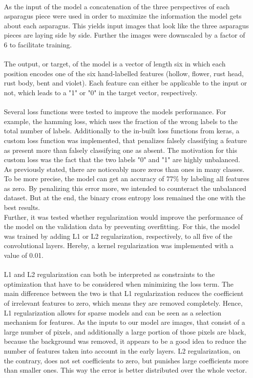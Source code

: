 \\
As the input of the model a concatenation of the three perspectives of each asparagus piece were used in order to maximize the information the model gets about each asparagus. This yields input images that look like the three asparagus pieces are laying side by side. Further the images were downscaled by a factor of 6 to facilitate training. \\
\\
The output, or target, of the model is a vector of length six in which each position encodes one of the six hand-labelled features (hollow, flower, rust head, rust body, bent and violet). Each feature can either be applicable to the input or not, which leads to a "1" or "0" in the target vector, respectively. \\
\\
Several loss functions were tested to improve the models performance. For example, the hamming loss, which uses the fraction of the wrong labels to the total number of labels. Additionally to the in-built loss functions from keras, a custom loss function was implemented, that penalizes falsely classifying a feature as present more than falsely classifying one as absent. The motivation for this custom loss was the fact that the two labels "0" and "1" are highly unbalanced. As previously stated, there are noticeably more zeros than ones in many classes. To be more precise, the model can get an accuracy of 77\% by labeling all features as zero. By penalizing this error more, we intended to counteract the unbalanced dataset. But at the end, the binary cross entropy loss remained the one with the best results. \\
Further, it was tested whether regularization would improve the performance of the model on the validation data by preventing overfitting. For this, the model was trained by adding L1 or L2 regularization, respectively, to all five of the convolutional layers.  Hereby, a kernel regularization was implemented with a value of 0.01. \\
\\
L1 and L2 regularization can both be interpreted as constraints to the optimization that have to be considered when minimizing the loss term. The main difference between the two is that L1 regularization reduces the coefficient of irrelevant features to zero, which means they are removed completely. Hence, L1 regularization allows for sparse models and can be seen as a selection mechanism for features. As the inputs to our model are images, that consist of a large number of pixels, and additionally a large portion of those pixels are black, because the background was removed, it appears to be a good idea to reduce the number of features taken into account in the early layers. L2 regularization, on the contrary, does not set coefficients to zero, but punishes large coefficients more than smaller ones. This way the error is better distributed over the whole vector. \\
